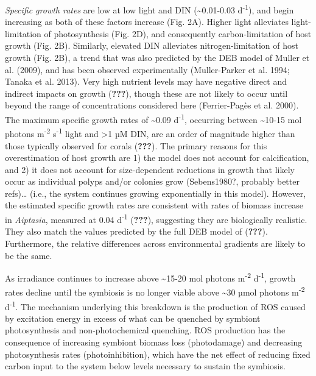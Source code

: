 \documentclass[]{elsarticle} %
\begin{document}
\emph{Specific growth rates} are low at low light and DIN
(\textasciitilde{}0.01-0.03 d\textsuperscript{-1}), and begin increasing
as both of these factors increase (Fig. 2A). Higher light alleviates
light-limitation of photosynthesis (Fig. 2D), and consequently
carbon-limitation of host growth (Fig. 2B). Similarly, elevated DIN
alleviates nitrogen-limitation of host growth (Fig. 2B), a trend that
was also predicted by the DEB model of Muller et al. (2009), and has
been observed experimentally (Muller-Parker et al. 1994; Tanaka et al.
2013). Very high nutrient levels may have negative direct and indirect
impacts on growth (\textbf{???}), though these are not likely to occur
until beyond the range of concentrations considered here (Ferrier-Pagès
et al. 2000). The maximum specific growth rates of \textasciitilde{}0.09
d\textsuperscript{-1}, occurring between \textasciitilde{}10-15 mol
photons m\textsuperscript{-2} s\textsuperscript{-1} light and
\textgreater{}1 µM DIN, are an order of magnitude higher than those
typically observed for corals (\textbf{???}). The primary reasons for
this overestimation of host growth are 1) the model does not account for
calcification, and 2) it does not account for size-dependent reductions
in growth that likely occur as individual polyps and/or colonies grow
(Sebens1980?, probably better refs)\ldots{} (i.e., the system continues
growing exponentially in this model). However, the estimated specific
growth rates are consistent with rates of biomass increase in
\emph{Aiptasia}, measured at 0.04 d\textsuperscript{-1} (\textbf{???}),
suggesting they are biologically realistic. They also match the values
predicted by the full DEB model of (\textbf{???}). Furthermore, the
relative differences across environmental gradients are likely to be the
same.

As irradiance continues to increase above \textasciitilde{}15-20 mol
photons m\textsuperscript{-2} d\textsuperscript{-1}, growth rates
decline until the symbiosis is no longer viable above
\textasciitilde{}30 µmol photons m\textsuperscript{-2}
d\textsuperscript{-1}. The mechanism underlying this breakdown is the
production of ROS caused by excitation energy in excess of what can be
quenched by symbiont photosynthesis and non-photochemical quenching. ROS
production has the consequence of increasing symbiont biomass loss
(photodamage) and decreasing photosynthesis rates (photoinhibition),
which have the net effect of reducing fixed carbon input to the system
below levels necessary to sustain the symbiosis.
\end{document}
